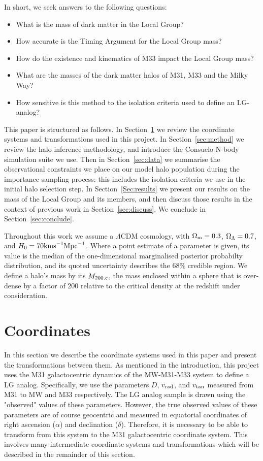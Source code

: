 \documentclass[iop,apj]{emulateapj}
\newcommand{\LCDM}{$\Lambda$CDM }
\def\distance{D}
\def\vrad{v_{\rm rad}}
\def\vtan{v_{\rm tan}}
\newcommand{\Mpc}{{\rm Mpc}}
\newcommand{\kms}{{\rm km s}^{-1}}
\newcommand{\consuelo}{{\sc Consuelo }}
\def\Sref#1{Section~\ref{#1}}
\begin{document}
In short, we seek answers to the following questions:
\begin{itemize}
\item What is the mass of dark matter in the Local Group?
\item How accurate is the Timing Argument for the Local Group mass?
\item How do the existence and kinematics of M33 impact the Local Group mass?
\item What are the masses of the dark matter halos of M31, M33 and the Milky
Way?
\item How sensitive is this method to the isolation criteria used to define an LG-analog?
\end{itemize}

This paper is structured as follows. In \Sref{sec:coord} we review the coordinate systems and transformations used in this project.  In \Sref{sec:method} we review the
halo inference methodology, and introduce the \consuelo N-body
simulation suite we use. Then in \Sref{sec:data} we summarise the
observational constraints we place on our model halo population during
the importance sampling process: this includes the isolation criteria we
use in the initial halo selection step. In \Sref{Sec:results} we present
our results on the mass of the Local Group and its members, and then
discuss those results in the context of previous work in
\Sref{sec:discuss}. We conclude in \Sref{sec:conclude}.

Throughout this work we assume a \LCDM cosmology, with $\Omega_{\rm m} =
0.3$, $\Omega_{\rm \Lambda} = 0.7$, and $H_0 = 70 \kms \Mpc^{-1}$. Where
a point estimate of a parameter is given, its value is the median of the
one-dimensional marginalised posterior probabilty distribution, and its
quoted uncertainty describes the 68\% credible region.
We define a halo's mass by its $M_{200,\rm c}$, the mass enclosed within a
sphere that is over-dense by a factor of 200 relative to the critical density
at the redshift under consideration.


\section{Coordinates}
\label{sec:coord}

In this section we describe the coordinate systems used in this paper and present the transformations between them.  As mentioned in the introduction, this project uses the M31 galactocentric dynamics of the MW-M31-M33 system to define a LG analog.  Specifically, we use the parameters $\distance$, $\vrad$, and $\vtan$ measured from M31 to MW and M33 respectively.  The LG analog sample is drawn using the "observed" values of these parameters.  However, the true observed values of these parameters are of course geocentric and measured in equatorial coordinates of right ascension ($\alpha$) and declination ($\delta$).  Therefore, it is necessary to be able to transform from this system to the M31 galactocentric coordinate system.  This involves many intermediate coordinate systems and transformations which will be described in the remainder of this section.
\end{document}
